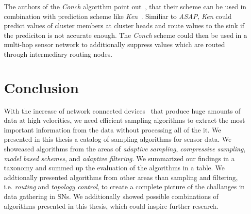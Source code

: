 The authors of the \textit{Conch} algorithm point
out~\cite{silberstein2006constraint}, that their scheme can be used in
combination with prediction scheme like \textit{Ken}~\cite{jain2004adaptive}.
Similiar to \textit{ASAP}, \textit{Ken} could predict values of cluster members
at cluster heads and route values to the sink if the prediciton is not accurate
enough. The \textit{Conch} scheme could then be used in a multi-hop sensor
network to additionally suppress values which are routed through intermediary
routing nodes.

\section{Conclusion}

With the increase of network connected devices~\cite{gartner} that produce huge
amounts of data at high velocities, we need efficient sampling algorithms to
extract the most important information from the data without processing all of
the it. We presented in this thesis a catalog of sampling algorithms for sensor
data. We showcased algorithms from the areas of \textit{adaptive sampling},
\textit{compressive sampling}, \textit{model based schemes}, and
\textit{adaptive filtering}. We summarized our findings in a taxonomy and
summed up the evaluation of the algorithms in a table. We addtionally presented
algorithms from other areas than sampling and filtering, i.e. \textit{routing}
and \textit{topology control}, to create a complete picture of the challanges
in data gathering in \acp{SN}. We additionally showed possible combinations of
algorithms presented in this thesis, which could inspire further research.



